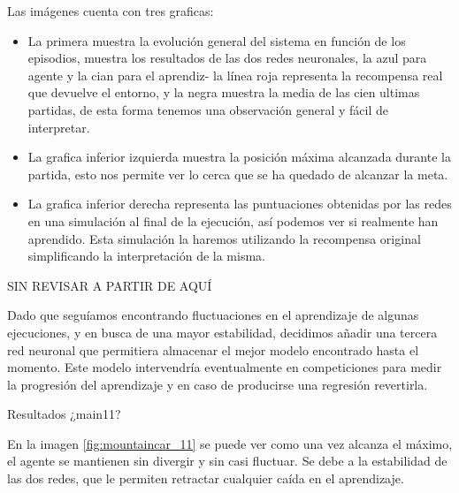 Las imágenes cuenta con tres graficas:
\begin{itemize}
    \item La primera muestra la evolución general del sistema en función de los episodios, muestra los resultados de las dos redes neuronales, la azul para agente y la cian para el aprendiz- la línea roja representa la recompensa real que devuelve el entorno, y la negra muestra la media de las cien ultimas partidas, de esta forma tenemos una observación general y fácil de interpretar.
    \item La grafica inferior izquierda muestra la posición máxima alcanzada durante la partida, esto nos permite ver lo cerca que se ha quedado de alcanzar la meta.
    \item La grafica inferior derecha representa las puntuaciones obtenidas por las redes en una simulación al final de la ejecución, así podemos ver si realmente han aprendido. Esta simulación la haremos utilizando la recompensa original simplificando la interpretación de la misma.  
\end{itemize}
 
SIN REVISAR A PARTIR DE AQUÍ

Dado que seguíamos encontrando fluctuaciones en el aprendizaje de algunas ejecuciones, y en busca de una mayor estabilidad, decidimos añadir una tercera red neuronal que permitiera almacenar el mejor modelo encontrado hasta el momento. Este modelo intervendría eventualmente en competiciones para medir la progresión del aprendizaje y en caso de producirse una regresión revertirla.

%
       {Resultados ¿main11?}

En la imagen \ref{fig:mountaincar_11} se puede ver como una vez alcanza el máximo, el agente se mantienen sin divergir y sin casi fluctuar. Se debe a la estabilidad de las dos redes, que le permiten retractar cualquier caída en el aprendizaje.



